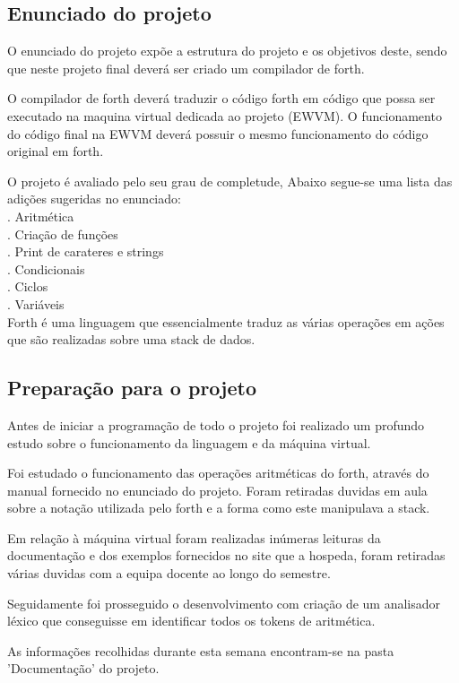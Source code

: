\documentclass{article}
\begin{document}
\subsection{Enunciado do projeto}
O enunciado do projeto expõe a estrutura do projeto e os objetivos deste, sendo que neste projeto final deverá ser criado um compilador de forth. 

O compilador de forth deverá traduzir o código forth em código que possa ser executado na maquina virtual dedicada ao projeto (EWVM). O funcionamento do código final na EWVM deverá possuir o mesmo funcionamento do código original em forth.

O projeto é avaliado pelo seu grau de completude, Abaixo segue-se uma lista das adições sugeridas no enunciado: \\
. Aritmética \\
. Criação de funções \\
. Print de carateres e strings  \\
. Condicionais \\
. Ciclos \\
. Variáveis \\ 

Forth é uma linguagem que essencialmente traduz as várias operações em ações que são realizadas sobre uma stack de dados. 





\subsection{Preparação para o projeto}
Antes de iniciar a programação de todo o projeto foi realizado um profundo estudo sobre o funcionamento da linguagem e da máquina virtual. 

Foi estudado o funcionamento das operações aritméticas do forth, através do manual fornecido no enunciado do projeto. Foram retiradas duvidas em aula sobre a notação utilizada pelo forth e a forma como este manipulava a stack. 

Em relação à máquina virtual foram realizadas inúmeras leituras da documentação e dos exemplos fornecidos no site que a hospeda, foram retiradas várias duvidas com a equipa docente ao longo do semestre.

Seguidamente foi prosseguido o desenvolvimento com criação de um analisador léxico que conseguisse em identificar todos os tokens de aritmética.

As informações recolhidas durante esta semana encontram-se na pasta 'Documentação' do projeto.
\end{document}
